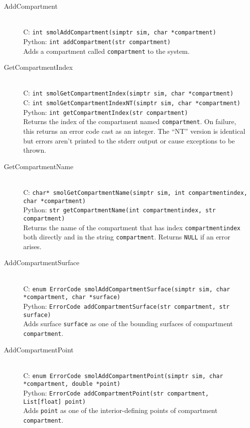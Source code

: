 \documentclass {book}
\newcommand {\ttt} {\texttt}
\begin{document}
\begin{description}

\item[AddCompartment]
\hfill \\
C: \ttt{int smolAddCompartment(simptr sim, char *compartment)}\\
Python: \ttt{int addCompartment(str compartment)}\\
Adds a compartment called \ttt{compartment} to the system.

\item[GetCompartmentIndex]
\hfill \\
C: \ttt{int smolGetCompartmentIndex(simptr sim, char *compartment)}\\
C: \ttt{int smolGetCompartmentIndexNT(simptr sim, char *compartment)}\\
Python: \ttt{int getCompartmentIndex(str compartment)}\\
Returns the index of the compartment named \ttt{compartment}. On failure, this returns an error code cast as an integer. The ``NT'' version is identical but errors aren't printed to the stderr output or cause exceptions to be thrown.

\item[GetCompartmentName]
\hfill \\
C: \ttt{char* smolGetCompartmentName(simptr sim, int compartmentindex, char *compartment)}\\
Python: \ttt{str getCompartmentName(int compartmentindex, str compartment)}\\
Returns the name of the compartment that has index \ttt{compartmentindex} both directly and in the string \ttt{compartment}. Returns \ttt{NULL} if an error arises.

\item[AddCompartmentSurface]
\hfill \\
C: \ttt{enum ErrorCode smolAddCompartmentSurface(simptr sim, char *compartment, char *surface)}\\
Python: \ttt{ErrorCode addCompartmentSurface(str compartment, str surface)}\\
Adds surface \ttt{surface} as one of the bounding surfaces of compartment \ttt{compartment}.

\item[AddCompartmentPoint]
\hfill \\
C: \ttt{enum ErrorCode smolAddCompartmentPoint(simptr sim, char *compartment, double *point)}\\
Python: \ttt{ErrorCode addCompartmentPoint(str compartment, List[float] point)}\\
Adds \ttt{point} as one of the interior-defining points of compartment \ttt{compartment}.


\end{description}
\end{document}
